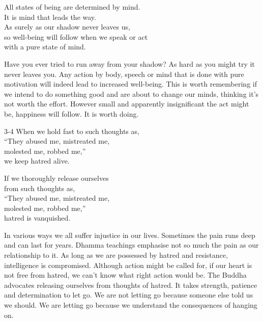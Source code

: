 
\begin{dhpVerse}{2}
\label{dhp-2}
All states of being are determined by mind.\\
It is mind that leads the way.\\
As surely as our shadow never leaves us,\\
so well-being will follow when we speak or act\\
with a pure state of mind.
\end{dhpVerse}

\begin{dhpRefl}

Have you ever tried to run away from your shadow? As hard as you
might try it never leaves you. Any action by body, speech or mind
that is done with pure motivation will indeed lead to increased
well-being. This is worth remembering if we intend to do something
good and are about to change our minds, thinking it's not worth the
effort. However small and apparently insignificant the act might be,
happiness will follow. It is worth doing.

\end{dhpRefl}


\begin{dhpVerse}{3-4}
\label{dhp-3}\label{dhp-4}
When we hold fast to such thoughts as,\\
``They abused me, mistreated me,\\
molested me, robbed me,''\\
we keep hatred alive.

If we thoroughly release ourselves\\
from such thoughts as,\\
``They abused me, mistreated me,\\
molested me, robbed me,''\\
hatred is vanquished.
\end{dhpVerse}

\begin{dhpRefl}

In various ways we all suffer injustice in our lives. Sometimes the
pain runs deep and can last for years. Dhamma teachings emphasise not
so much the pain as our relationship to it. As long as we are
possessed by hatred and resistance, intelligence is compromised.
Although action might be called for, if our heart is not free from
hatred, we can't know what right action would be. The Buddha
advocates releasing ourselves from thoughts of hatred. It takes
strength, patience and determination to let go. We are not letting go
because someone else told us we should. We are letting go because we
understand the consequences of hanging on.

\end{dhpRefl}

